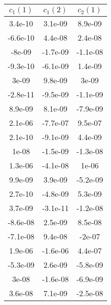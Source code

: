 \begin{tiny}\begin{tabular}{|c|c|c|}
\hline
\textbf{$c_1(1)$}&\textbf{$c_1(2)$}&\textbf{$c_2(1)$}\\\hline
3.4e-10&3.1e-09&8.9e-09\\\hline
-6.6e-10&4.4e-08&2.4e-08\\\hline
-8e-09&-1.7e-09&-1.1e-08\\\hline
-9.3e-10&-6.1e-09&1.4e-09\\\hline
3e-09&9.8e-09&3e-09\\\hline
-2.8e-11&-9.5e-09&-1.1e-09\\\hline
8.9e-09&8.1e-09&-7.9e-09\\\hline
2.1e-06&-7.7e-07&9.5e-07\\\hline
2.1e-10&-9.1e-09&4.4e-09\\\hline
1e-08&-1.5e-09&-1.3e-08\\\hline
1.3e-06&-4.1e-08&1e-06\\\hline
9.9e-09&3.9e-09&-5.2e-09\\\hline
2.7e-10&-4.8e-09&5.3e-09\\\hline
3.7e-09&-3.1e-11&-1.2e-08\\\hline
-8.6e-08&2.5e-09&8.5e-08\\\hline
-7.1e-08&9.4e-08&-2e-07\\\hline
1.9e-06&-1.6e-06&4.4e-07\\\hline
-5.3e-09&2.6e-09&-5.8e-09\\\hline
3e-08&-1.6e-08&-6.9e-09\\\hline
3.6e-08&7.1e-09&-2.5e-08\\\hline
\end{tabular}
\end{tiny}